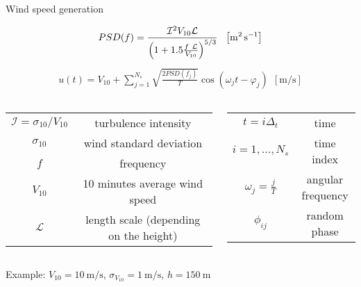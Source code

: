 \begin{frame}{Wind speed generation}

{ \footnotesize
  \begin{equation*}
      PSD(f) = \frac{\mathcal{I} ^2V_{10}\mathcal{L} }{\left(1+1.5\frac{f \ \mathcal{L} }{V_{10}}\right)^{5/3}} \ \ \left[\si{\square \meter \per \second}\right]
      \label{eq:PSD}
  \end{equation*}
  \begin{gather*}
      u(t) = V_{10}+\sum_{j=1}^{N_s}\sqrt{\frac{2PSD(f_j)}{T}}\cos{(\omega_jt-\varphi_j)} \ \ \left[\si{\meter \per \second}\right]
      \label{eq:wind_series}
  \end{gather*}
}

{\tiny
  \begin{columns}
    \begin{column}{0.5\columnwidth}
      \begin{table}
        \begin{tabular}{cc}
          \toprule
          $\mathcal{I}=\sigma_{10}/V_{10}$ & turbulence intensity\\
          $\sigma_{10}$ & wind standard deviation\\
          $f$ & frequency\\
          $V_{10}$ & 10 minutes average wind speed\\
          $\mathcal{L}$ & length scale (depending on the height)\\
          \bottomrule
        \end{tabular}
      \end{table}
    \end{column}
    
    \begin{column}{0.5\columnwidth}
      \begin{table}
        \begin{tabular}{cc}
          \toprule
          $t=i\Delta_t$ & time\\
          $i=1,\dots,N_s$ & time index\\
          $\omega_j=\frac{j}{T}$ & angular frequency\\
          $\phi_{ij}$ & random phase\\
          \bottomrule
        \end{tabular}
      \end{table}
    \end{column}  
  \end{columns}
}
Example: $V_{10}=10 \ \si{\meter\per\second}$, $\sigma_{V_{10}}=1 \ \si{\meter\per\second}$, $h=150 \ \si{\meter}$


\end{frame}
